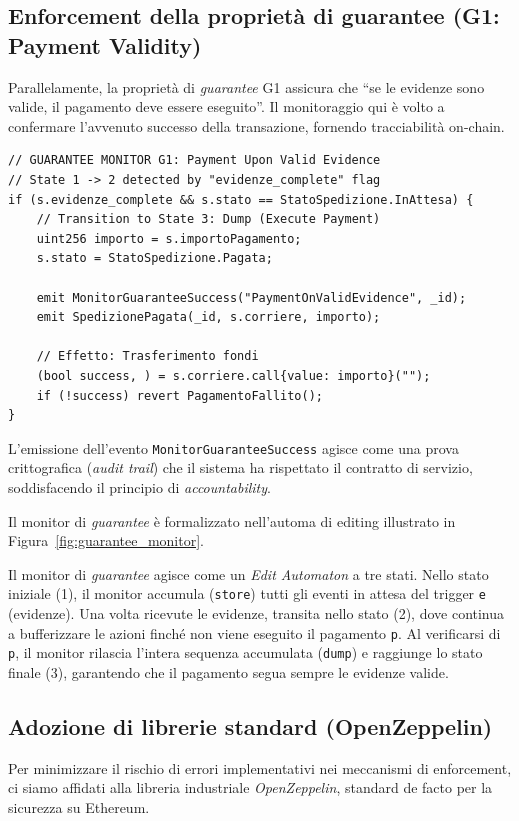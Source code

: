 \subsection{Enforcement della proprietà di guarantee (G1: Payment Validity)}
Parallelamente, la proprietà di \textit{guarantee} G1 assicura che ``se le evidenze sono valide, il pagamento deve essere eseguito''. Il monitoraggio qui è volto a confermare l'avvenuto successo della transazione, fornendo tracciabilità on-chain.

\begin{lstlisting}[language=Solidity, caption=Monitor di guarantee per il pagamento]
// GUARANTEE MONITOR G1: Payment Upon Valid Evidence
// State 1 -> 2 detected by "evidenze_complete" flag
if (s.evidenze_complete && s.stato == StatoSpedizione.InAttesa) {
    // Transition to State 3: Dump (Execute Payment)
    uint256 importo = s.importoPagamento;
    s.stato = StatoSpedizione.Pagata;

    emit MonitorGuaranteeSuccess("PaymentOnValidEvidence", _id);
    emit SpedizionePagata(_id, s.corriere, importo);

    // Effetto: Trasferimento fondi
    (bool success, ) = s.corriere.call{value: importo}("");
    if (!success) revert PagamentoFallito();
}
\end{lstlisting}

L'emissione dell'evento \texttt{MonitorGuaranteeSuccess} agisce come una prova crittografica (\textit{audit trail}) che il sistema ha rispettato il contratto di servizio, soddisfacendo il principio di \textit{accountability}.

Il monitor di \textit{guarantee} è formalizzato nell'automa di editing illustrato in Figura~\ref{fig:guarantee_monitor}.


Il monitor di \textit{guarantee} agisce come un \textit{Edit Automaton} a tre stati. Nello stato iniziale (1), il monitor accumula (\texttt{store}) tutti gli eventi in attesa del trigger \texttt{e} (evidenze). Una volta ricevute le evidenze, transita nello stato (2), dove continua a bufferizzare le azioni finché non viene eseguito il pagamento \texttt{p}. Al verificarsi di \texttt{p}, il monitor rilascia l'intera sequenza accumulata (\texttt{dump}) e raggiunge lo stato finale (3), garantendo che il pagamento segua sempre le evidenze valide.

\subsection{Adozione di librerie standard (OpenZeppelin)}
Per minimizzare il rischio di errori implementativi nei meccanismi di enforcement, ci siamo affidati alla libreria industriale \textit{OpenZeppelin}, standard de facto per la sicurezza su Ethereum.

